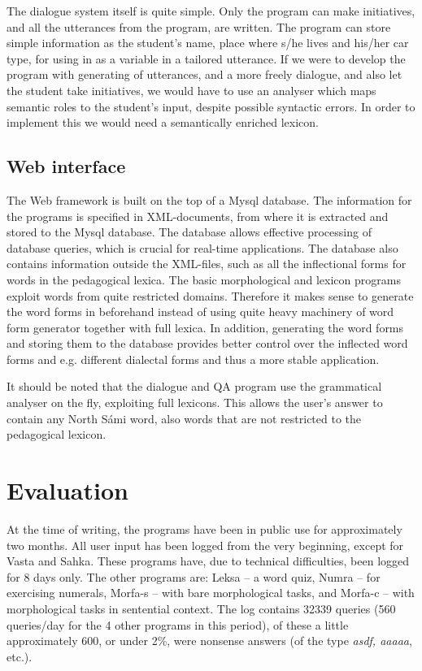 \documentclass[11pt]{article}
\begin{document}
The dialogue system itself is quite simple. Only
the program can make initiatives, and all the utterances from the program, are written. The program can store simple information as the student's name, place where s/he lives and his/her car type, for using in as a variable in a tailored utterance. If we were to develop the program with generating of utterances, and a more freely dialogue, and also let the student take initiatives, we would have to use an analyser which maps semantic roles to the student's input, despite possible syntactic errors. In order to implement this we would need a semantically enriched lexicon.



\subsection{Web interface}

The Web framework is built on the top of a Mysql database. The information for the programs is specified in XML-documents, from where it is extracted and stored to the Mysql database. The database allows effective processing of database queries, which is crucial for real-time applications. The database also contains information outside the XML-files, such as all the inflectional forms for words in the pedagogical lexica. The basic morphological and lexicon programs exploit words from quite restricted domains. Therefore it makes sense to generate the word forms in beforehand instead of using quite heavy machinery of word form generator together with full lexica. In addition, generating the word forms and storing them to the database provides better control over the inflected word forms and e.g. different dialectal forms and thus a more stable application.

It should be noted that 
the dialogue and QA program
 use the grammatical analyser on the fly, exploiting full lexicons. This allows the user's answer to contain any North Sámi word, also words that are not restricted to the pedagogical lexicon.

\section{Evaluation}

At the time of writing, the programs have been in public use for approximately two months. All user input has been logged from the very beginning, except for Vasta and Sahka. These programs have, due to technical difficulties, been logged for 8 days only. The other programs are: Leksa -- a word quiz, Numra -- for exercising numerals, Morfa-s -- with bare morphological tasks, and Morfa-c -- with morphological tasks in sentential context. The log contains 32339 queries (560 queries/day for the 4 other programs in this period), of these a little approximately 600, or under 2\%, were nonsense answers (of the type \textit{asdf, aaaaa}, etc.).
\end{document}
